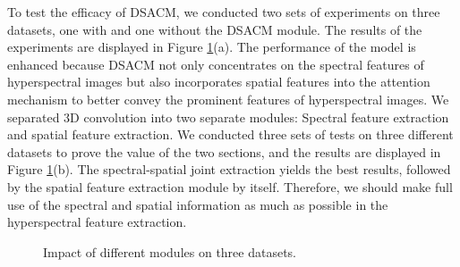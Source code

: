 \documentclass[]{interact}
\theoremstyle{plain}%
\theoremstyle{definition}
\theoremstyle{remark}
\begin{document}
To test the efficacy of DSACM, we conducted two sets of experiments on three datasets, one with and one without the DSACM module. The results of the experiments are displayed in Figure \ref{fig:10}(a). The performance of the model is enhanced because DSACM not only concentrates on the spectral features of hyperspectral images but also incorporates spatial features into the attention mechanism to better convey the prominent features of hyperspectral images. We separated 3D convolution into two separate modules: Spectral feature extraction and spatial feature extraction. We conducted three sets of tests on three different datasets to prove the value of the two sections, and the results are displayed in Figure \ref{fig:10}(b). The spectral-spatial joint extraction yields the best results, followed by the spatial feature extraction module by itself. Therefore, we should make full use of the spectral and spatial information as much as possible in the hyperspectral feature extraction.



\begin{figure}[!h]
\centering\small
{}

\caption{Impact of different modules on three datasets.}\label{fig:10}
\end{figure}
\end{document}
